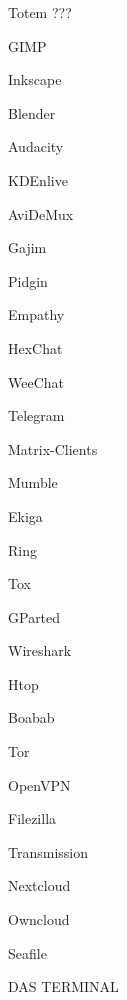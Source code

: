 \begin{frame}[allowframebreaks]
\begin{description}[style=nextline]
\item Totem ??? 
\item  [Medienproduktion] GIMP 
\item Inkscape 
\item Blender 
\item Audacity 
\item KDEnlive 
\item AviDeMux 
\item  [Messenger] Gajim 
\item Pidgin 
\item Empathy 
\item HexChat 
\item WeeChat 
\item Telegram 
\item Matrix-Clients 
\item  [VoIP] Mumble 
\item Ekiga 
\item Ring 
\item Tox 
\item  [System] GParted 
\item Wireshark 
\item Htop 
\item Boabab 
\item Tor 
\item OpenVPN 
\item Filezilla 
\item  [  Torrents] Transmission 
\item  [Synchronisation] Nextcloud 
\item Owncloud 
\item Seafile 
\item   [alles] DAS TERMINAL 
\end{description}

 \end{frame}




